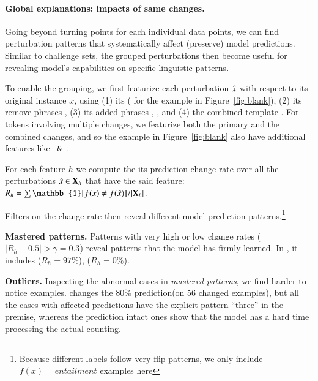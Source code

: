 \paragraph{Global explanations: impacts of same changes.}
Going beyond turning points for each individual data points, we can find perturbation patterns that systematically affect (preserve) model predictions.
Similar to challenge sets, the grouped perturbations then become useful for revealing model's capabilities on specific linguistic patterns.

To enable the grouping, we first featurize each perturbation $\hat{x}$ with respect to its original instance $x$, using 
(1) its \tagstr ( for the example in Figure~\ref{fig:blank}), 
(2) its remove phrases , 
(3) its added phrases , , and 
(4) the combined template .
For tokens involving multiple changes, we featurize both the primary and the combined changes, and so the example in Figure~\ref{fig:blank} also have additional features like \texttt{ \& }.

For each feature $h$ we compute the its prediction change rate over all the perturbations $\hat{x} \in \mathbf{X}_{h}$ that have the said feature: 
$R_h = \sum {\mathbb{1}[f(x) \not\eq f(\xp)]} / |\xset_h|$.

Filters on the change rate then reveal different model prediction patterns.\footnote{Because different \nli labels follow very flip patterns, we only include $f(x)=entailment$ examples here}

\noindent\textbf{Mastered patterns.}
Patterns with very high or low change rates (\eg $|R_h-0.5| > \gamma=0.3$) reveal patterns that the model has firmly learned.
In \nli, it includes  ($R_h=97\%$),  ($R_h=0\%$).

\noindent\textbf{Outliers.}
Inspecting the abnormal cases in \emph{mastered patterns}, we find harder to notice examples.
 changes the 80\% prediction(on 56 changed examples), but all the cases with affected predictions have the explicit pattern ``three'' in the premise, whereas the prediction intact ones show that the model has a hard time processing the actual counting.


